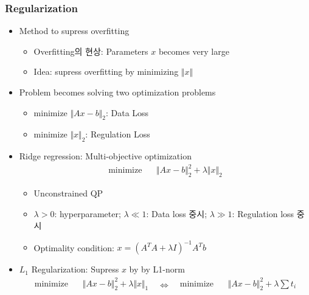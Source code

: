 \subsubsection*{Regularization}
\begin{itemize}
    \item Method to supress overfitting
    \begin{itemize}
        \item Overfitting의 현상: Parameters $x$ becomes very large
        \item Idea: supress overfitting by minimizing $\Vert x\Vert$
    \end{itemize}
    \item Problem becomes solving two optimization problems
    \begin{itemize}
        \item minimize $\Vert Ax-b\Vert_2$: Data Loss
        \item minimize $\Vert x\Vert_2$: Regulation Loss
    \end{itemize}
    \item Ridge regression: Multi-objective optimization
        $$ \begin{aligned}
            \mathrm{minimize}~~&~~\Vert Ax-b\Vert_2^2+\lambda\Vert x\Vert_2
        \end{aligned} $$
    \begin{itemize}
        \item Unconstrained QP
        \item $\lambda>0$: hyperparameter; $\lambda\ll1$: Data loss 중시; $\lambda\gg1$: Regulation loss 중시
        \item Optimality condition: $x=\left(A^TA+\lambda I\right)^{-1}A^Tb$
    \end{itemize}
    \begin{figures}
    \end{figures}
    \newpage
    \item $L_1$ Regularization: Supress $x$ by by L1-norm
        $$ \begin{aligned}
            \mathrm{minimize}~~&~~\Vert Ax-b\Vert_2^2+\lambda\Vert x\Vert_1 \\ {}
        \end{aligned}~~~\Leftrightarrow~~~\begin{aligned}
            \mathrm{minimize}~~&~~\Vert Ax-b\Vert_2^2+\lambda\sum t_i \\

\end{aligned}$$
\end{itemize}
